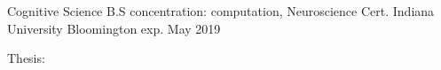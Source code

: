 
\begin{cventries}

  \cventry
    {Cognitive Science B.S concentration: computation, Neuroscience Cert.} %
    {Indiana University Bloomington} %
    {} %
    {exp. May 2019} %
    {
      \begin{cvitems} %
	\item{Thesis: }
      \end{cvitems}
    }


\end{cventries}
